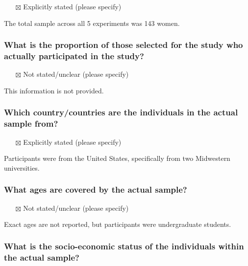 \documentclass[
  doc, a4paper]{apa7}
\providecommand{\tightlist}{%
  \setlength{\itemsep}{0pt}\setlength{\parskip}{0pt}}
\begin{document}
\begin{itemize}
\tightlist
\item[$\boxtimes$]
  Explicitly stated (please specify)
\end{itemize}

The total sample across all 5 experiments was 143 women.

\subsubsection{What is the proportion of those selected for the study who actually participated in the study?}\label{what-is-the-proportion-of-those-selected-for-the-study-who-actually-participated-in-the-study}

\begin{itemize}
\tightlist
\item[$\boxtimes$]
  Not stated/unclear (please specify)
\end{itemize}

This information is not provided.

\subsubsection{Which country/countries are the individuals in the actual sample from?}\label{which-countrycountries-are-the-individuals-in-the-actual-sample-from}

\begin{itemize}
\tightlist
\item[$\boxtimes$]
  Explicitly stated (please specify)
\end{itemize}

Participants were from the United States, specifically from two Midwestern universities.

\subsubsection{What ages are covered by the actual sample?}\label{what-ages-are-covered-by-the-actual-sample}

\begin{itemize}
\tightlist
\item[$\boxtimes$]
  Not stated/unclear (please specify)
\end{itemize}

Exact ages are not reported, but participants were undergraduate students.

\subsubsection{What is the socio-economic status of the individuals within the actual sample?}\label{what-is-the-socio-economic-status-of-the-individuals-within-the-actual-sample}
\end{document}

